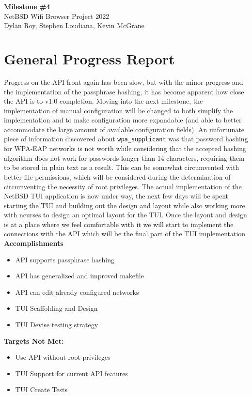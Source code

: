 \documentclass[11pt]{article}
\begin{document}
\begin{center}
  \textbf{\Large Milestone \#4}\\\large NetBSD Wifi Browser Project 2022\\
  Dylan Roy, Stephen Loudiana, Kevin McGrane
\end{center}


\section{General Progress Report}
Progress on the API front again has been slow, but with the minor progress
and the implementation of the passphrase hashing, it has become apparent
how close the API is to v1.0 completion. Moving into the next milestone, 
the implementation of manual configuration will be changed to both simplify
the implementation and to make configuration more expandable (and able to
better accommodate the large amount of available configuration fields). An
unfortunate piece of information discovered about \texttt{wpa\_supplicant}
was that password hashing for WPA-EAP networks is not worth while considering
that the accepted hashing algorithm does not work for passwords longer than
14 characters, requiring them to be stored in plain text as a result. This
can be somewhat circumvented with better file permissions, which will be considered
during the determination of circumventing the necessity of root privileges. The 
actual implementation of the NetBSD TUI application is now under way, the next 
few days will be spent starting the TUI and building out the design and layout while
also working more with ncurses to design an optimal layout for the TUI. Once the 
layout and design is at a place where we feel comfortable with it we will start 
to implement the connections with the API which will be the final part of the 
TUI implementation\\

\textbf{Accomplishments}
\begin{itemize}
  \item API supports passphrase hashing
  \item API has generalized and improved makefile
  \item API can edit already configured networks
  \item TUI Scaffolding and Design
  \item TUI Devise testing strategy
\end{itemize}

\textbf{Targets Not Met:}
\begin{itemize}
  \item Use API without root privileges
  \item TUI Support for current API features
  \item TUI Create Tests
\end{itemize}
\end{document}
